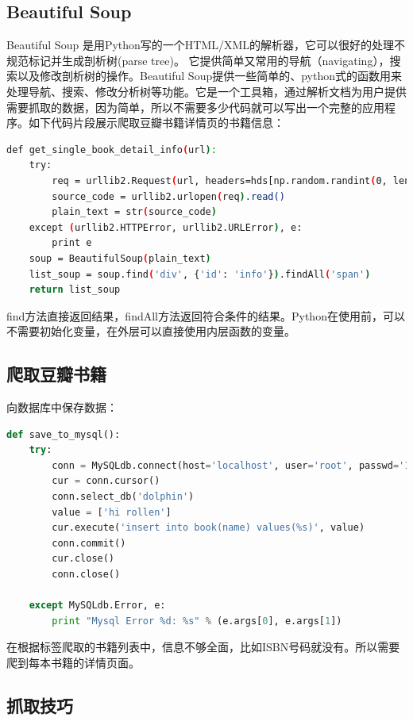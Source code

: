 \documentclass[letter]{book}
\begin{document}
\subsection{Beautiful Soup}

Beautiful Soup 是用Python写的一个HTML/XML的解析器，它可以很好的处理不规范标记并生成剖析树(parse tree)。 它提供简单又常用的导航（navigating），搜索以及修改剖析树的操作。Beautiful Soup提供一些简单的、python式的函数用来处理导航、搜索、修改分析树等功能。它是一个工具箱，通过解析文档为用户提供需要抓取的数据，因为简单，所以不需要多少代码就可以写出一个完整的应用程序。如下代码片段展示爬取豆瓣书籍详情页的书籍信息：

\begin{lstlisting}[language=Bash]
def get_single_book_detail_info(url):
	try:
		req = urllib2.Request(url, headers=hds[np.random.randint(0, len(hds))])
		source_code = urllib2.urlopen(req).read()
		plain_text = str(source_code)
	except (urllib2.HTTPError, urllib2.URLError), e:
		print e
	soup = BeautifulSoup(plain_text)
	list_soup = soup.find('div', {'id': 'info'}).findAll('span')
	return list_soup
\end{lstlisting}

find方法直接返回结果，findAll方法返回符合条件的结果。Python在使用前，可以不需要初始化变量，在外层可以直接使用内层函数的变量。

\subsection{爬取豆瓣书籍}

向数据库中保存数据：

\begin{lstlisting}[language=Python]
def save_to_mysql():
	try:
		conn = MySQLdb.connect(host='localhost', user='root', passwd='123456', port=3306)
		cur = conn.cursor()
		conn.select_db('dolphin')
		value = ['hi rollen']
		cur.execute('insert into book(name) values(%s)', value)
		conn.commit()
		cur.close()
		conn.close()
	
	except MySQLdb.Error, e:
		print "Mysql Error %d: %s" % (e.args[0], e.args[1])
\end{lstlisting}

在根据标签爬取的书籍列表中，信息不够全面，比如ISBN号码就没有。所以需要爬到每本书籍的详情页面。

\subsection{抓取技巧}
\end{document}
